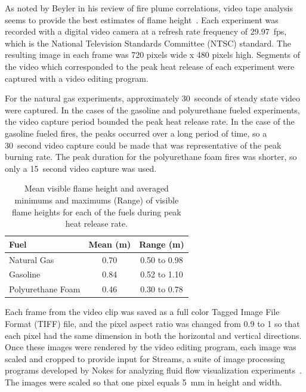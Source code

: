 \documentclass[twoside]{uocthesis}
\begin{document}
{As noted by Beyler in his review of fire plume correlations, video tape analysis seems to provide the best estimates of flame height~\cite{Beyler:1986}. Each experiment was recorded with a digital video camera at a refresh rate frequency of 29.97~fps, which is the National Television Standards Committee (NTSC) standard. The resulting image in each frame was 720 pixels wide x 480 pixels high. Segments of the video which corresponded to the peak heat release of each experiment were captured with a video editing program.

For the natural gas experiments, approximately 30~seconds of steady state video were captured.  In the cases of the gasoline and polyurethane fueled experiments, the video capture period bounded the peak heat release rate.  In the case of the gasoline fueled fires, the peaks occurred over a long period of time, so a 30~second video capture could be made that was representative of the peak burning rate.  The peak duration for the polyurethane foam fires was shorter, so only a 15~second video capture was used.

\begin{table}
  \centering
  \begin{tabular}{|l|c|c|}
     \hline
     Fuel	            & Mean (m)  & Range (m) \\ \hline 
     Natural Gas	    & 0.70	    & 0.50 to 0.98 \\
     Gasoline 	        & 0.84	    & 0.52 to 1.10 \\
     Polyurethane Foam  & 0.46	    & 0.30 to 0.78 \\
     \hline
   \end{tabular}
  \caption[Mean visible flame height and averaged minimums and maximums]{Mean visible flame height and averaged minimums and maximums (Range) of visible flame heights for each of the fuels during peak heat release rate.}
  \label{tab:Flame_Heights}
\end{table}

Each frame from the video clip was saved as a full color Tagged Image File Format (TIFF) file, and the pixel aspect ratio was changed from 0.9 to 1 so that each pixel had the same dimension in both the horizontal and vertical directions.  Once these images were rendered by the video editing program, each image was scaled and cropped to provide input for Streams, a suite of image processing programs developed by Nokes for analyzing fluid flow visualization experiments~\cite{Nokes:2011}. The images were scaled so that one pixel equals 5~mm in height and width.

}
\end{document}
